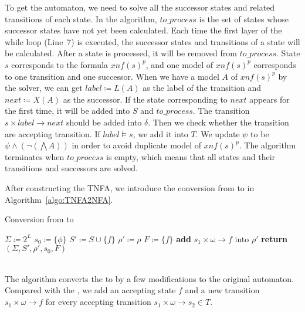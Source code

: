 To get the automaton, we need to solve all the successor states and related transitions of each state. In the algorithm, $to\_process$ is the set of states whose successor states have not yet been calculated. Each time the first layer of the while loop (Line~7) is executed, the successor states and transitions of a state will be calculated. After a state is processed, it will be removed from $to\_process$. State $s$ corresponds to the formula $xnf(s)^p$, and one model of $xnf(s)^p$ corresponds to one transition and one successor. When we have a model $A$ of $xnf(s)^p$ by the \SAT solver, we can get $label\coloneqq L(A)$ as the label of the transition and $next\coloneqq X(A)$ as the successor. If the state corresponding to $next$ appears for the first time, it will be added into $S$ and $to\_process$. The transition $s\times label\to next$ should be added into $\delta$. Then we check whether the transition are accepting transition. If $label\models s$, we add it into $T$. We update $\psi$ to be $\psi\land(\neg(\bigwedge A))$ in order to avoid duplicate model of $xnf(s)^p$. The algorithm terminates when $to\_process$ is empty, which means that all states and their transitions and successors are solved.

After constructing the TNFA, we introduce the conversion from \TNFA to \NFA in Algorithm~\ref{algo:TNFA2NFA}.

\begin{algorithm}[H] \label{algo:TNFA2NFA}
  \caption{Conversion from \TNFA to \NFA}
  \LinesNumbered
  $\Sigma\coloneqq 2^L$\;
  $s_0\coloneqq\{\phi\}$\;
  $S'\coloneqq S\cup \{f\}$\;
  $\rho'\coloneqq\rho$\;
  $F\coloneqq \{f\}$\;
  {
    \textbf{add} $s_1\times \omega\to f$ into $\rho'$\;
  }
  \textbf{return} $(\Sigma,S',\rho',s_0,F)$\;
  \end{algorithm}
~\\
The algorithm converts the \TNFA to \NFA by a few modifications to the original automaton. Compared with the \TNFA, we add an accepting state $f$ and a new transition $s_1\times \omega\to f$ for every accepting transition $s_1\times \omega\to s_2\in T$.
